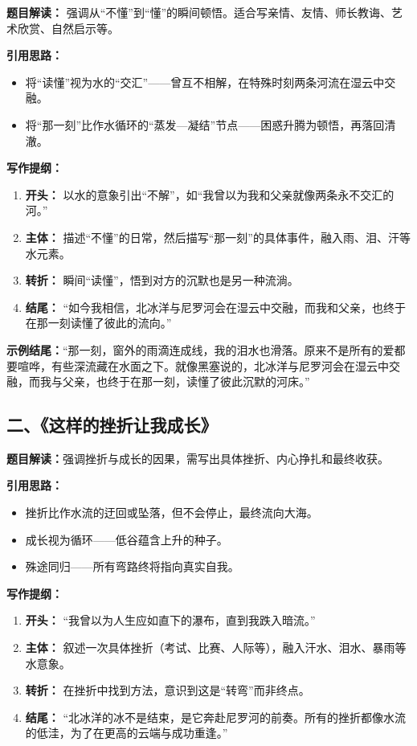 \textbf{题目解读：} 强调从“不懂”到“懂”的瞬间顿悟。适合写亲情、友情、师长教诲、艺术欣赏、自然启示等。

\textbf{引用思路：}
\begin{itemize}
    \item 将“读懂”视为水的“交汇”——曾互不相解，在特殊时刻两条河流在湿云中交融。
    \item 将“那一刻”比作水循环的“蒸发—凝结”节点——困惑升腾为顿悟，再落回清澈。
\end{itemize}

\textbf{写作提纲：}
\begin{enumerate}
    \item \textbf{开头：} 以水的意象引出“不解”，如“我曾以为我和父亲就像两条永不交汇的河。”
    \item \textbf{主体：} 描述“不懂”的日常，然后描写“那一刻”的具体事件，融入雨、泪、汗等水元素。
    \item \textbf{转折：} 瞬间“读懂”，悟到对方的沉默也是另一种流淌。
    \item \textbf{结尾：} “如今我相信，北冰洋与尼罗河会在湿云中交融，而我和父亲，也终于在那一刻读懂了彼此的流向。”
\end{enumerate}

\textbf{示例结尾：}“那一刻，窗外的雨滴连成线，我的泪水也滑落。原来不是所有的爱都要喧哗，有些深流藏在水面之下。就像黑塞说的，北冰洋与尼罗河会在湿云中交融，而我与父亲，也终于在那一刻，读懂了彼此沉默的河床。”



\subsection{二、《这样的挫折让我成长》}

\textbf{题目解读：}强调挫折与成长的因果，需写出具体挫折、内心挣扎和最终收获。

\textbf{引用思路：}
\begin{itemize}
    \item 挫折比作水流的迂回或坠落，但不会停止，最终流向大海。
    \item 成长视为循环——低谷蕴含上升的种子。
    \item 殊途同归——所有弯路终将指向真实自我。
\end{itemize}

\textbf{写作提纲：}
\begin{enumerate}
    \item \textbf{开头：} “我曾以为人生应如直下的瀑布，直到我跌入暗流。”
    \item \textbf{主体：} 叙述一次具体挫折（考试、比赛、人际等），融入汗水、泪水、暴雨等水意象。
    \item \textbf{转折：} 在挫折中找到方法，意识到这是“转弯”而非终点。
    \item \textbf{结尾：} “北冰洋的冰不是结束，是它奔赴尼罗河的前奏。所有的挫折都像水流的低洼，为了在更高的云端与成功重逢。”
\end{enumerate}

